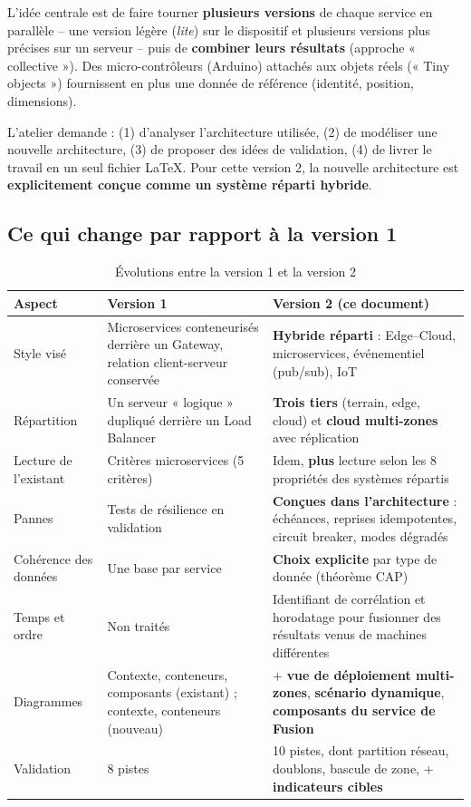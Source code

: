 \documentclass[11pt,a4paper]{article}
\begin{document}
L'idée centrale est de faire tourner \textbf{plusieurs versions} de chaque service en parallèle -- une version légère (\textit{lite}) sur le dispositif et plusieurs versions plus précises sur un serveur -- puis de \textbf{combiner leurs résultats} (approche « collective »). Des micro-contrôleurs (Arduino) attachés aux objets réels (« Tiny objects ») fournissent en plus une donnée de référence (identité, position, dimensions).

L'atelier demande : (1) d'analyser l'architecture utilisée, (2) de modéliser une nouvelle architecture, (3) de proposer des idées de validation, (4) de livrer le travail en un seul fichier \LaTeX. Pour cette version 2, la nouvelle architecture est \textbf{explicitement conçue comme un système réparti hybride}.

\subsection{Ce qui change par rapport à la version 1}

\begin{table}[h]
\centering
\begin{tabular}{|p{3.0cm}|p{5.6cm}|p{6.0cm}|}
\hline
\textbf{Aspect} & \textbf{Version 1} & \textbf{Version 2 (ce document)} \\
\hline
Style visé & Microservices conteneurisés derrière un Gateway, relation client-serveur conservée & \textbf{Hybride réparti} : Edge--Cloud, microservices, événementiel (pub/sub), IoT \\
\hline
Répartition & Un serveur « logique » dupliqué derrière un Load Balancer & \textbf{Trois tiers} (terrain, edge, cloud) et \textbf{cloud multi-zones} avec réplication \\
\hline
Lecture de l'existant & Critères microservices (5 critères) & Idem, \textbf{plus} lecture selon les 8 propriétés des systèmes répartis \\
\hline
Pannes & Tests de résilience en validation & \textbf{Conçues dans l'architecture} : échéances, reprises idempotentes, circuit breaker, modes dégradés \\
\hline
Cohérence des données & Une base par service & \textbf{Choix explicite} par type de donnée (théorème CAP) \\
\hline
Temps et ordre & Non traités & Identifiant de corrélation et horodatage pour fusionner des résultats venus de machines différentes \\
\hline
Diagrammes & Contexte, conteneurs, composants (existant) ; contexte, conteneurs (nouveau) & + \textbf{vue de déploiement multi-zones}, \textbf{scénario dynamique}, \textbf{composants du service de Fusion} \\
\hline
Validation & 8 pistes & 10 pistes, dont partition réseau, doublons, bascule de zone, + \textbf{indicateurs cibles} \\
\hline
\end{tabular}
\caption{Évolutions entre la version 1 et la version 2}
\end{table}
\end{document}
